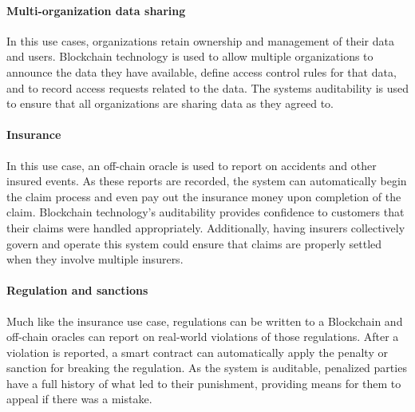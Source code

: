 \paragraph{Multi-organization data sharing}
In this use cases, organizations retain ownership and management of their data and users.
Blockchain technology is used to allow multiple organizations to announce the data they have available, define access control rules for that data, and to record access requests related to the data.
The systems auditability is used to ensure that all organizations are sharing data as they agreed to.

\paragraph{Insurance}
In this use case, an off-chain oracle is used to report on accidents and other insured events.
As these reports are recorded, the system can automatically begin the claim process and even pay out the insurance money upon completion of the claim.
Blockchain technology's auditability provides confidence to customers that their claims were handled appropriately.
Additionally, having insurers collectively govern and operate this system could ensure that claims are properly settled when they involve multiple insurers.

\paragraph{Regulation and sanctions}
Much like the insurance use case, regulations can be written to a Blockchain and off-chain oracles can report on real-world violations of those regulations.
After a violation is reported, a smart contract can automatically apply the penalty or sanction for breaking the regulation.
As the system is auditable, penalized parties have a full history of what led to their punishment, providing means for them to appeal if there was a mistake.


